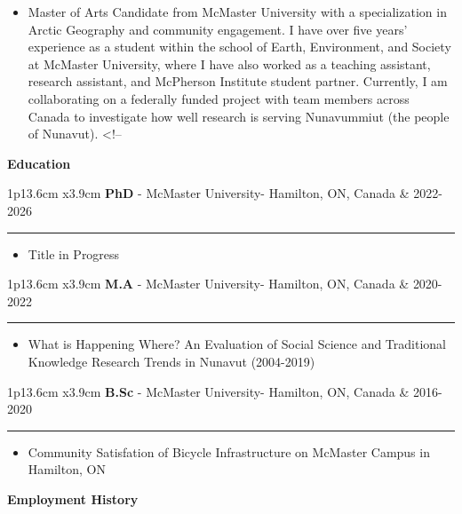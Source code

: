 \documentclass[10pt,a4paper,]{article}
\renewcommand{\section}[1]
{
	\begin{center}
		\large\textcolor{sectcol}{\textbf{#1}}
	\end{center}
}
\providecommand{\tightlist}{%
  \setlength{\itemsep}{0pt}\setlength{\parskip}{0pt}}
\newcommand{\cvevent}[4]
{

\begin{tabular*}{1\textwidth}{p{13.6cm}  x{3.9cm}}
	\textbf{#2} - \textcolor{bgcol}{#3} &   \vspace{2.5pt}\textcolor{sectcol}{#1}
\end{tabular*}

\vspace{-2pt}
\textcolor{softcol}{\hrule}
\vspace{6pt}
#4
\vspace{1em}
}
\begin{document}
\begin{itemize}
\tightlist
\item
  Master of Arts Candidate from McMaster University with a
  specialization in Arctic Geography and community engagement. I have
  over five years' experience as a student within the school of Earth,
  Environment, and Society at McMaster University, where I have also
  worked as a teaching assistant, research assistant, and McPherson
  Institute student partner. Currently, I am collaborating on a
  federally funded project with team members across Canada to
  investigate how well research is serving Nunavummiut (the people of
  Nunavut). \textless!--
\end{itemize}

\hypertarget{education}{%
\section{Education}\label{education}}

\cvevent{2022-2026}{PhD}{McMaster University- Hamilton, ON, Canada}{\begin{minipage}{0.7\textwidth}%
\begin{itemize}%
\item Title in Progress%
\end{itemize}%
\end{minipage}}
\cvevent{2020-2022}{M.A}{McMaster University- Hamilton, ON, Canada}{\begin{minipage}{0.7\textwidth}%
\begin{itemize}%
\item What is Happening Where? An Evaluation of Social Science and Traditional Knowledge Research Trends in Nunavut (2004-2019)%
\end{itemize}%
\end{minipage}}
\cvevent{2016-2020}{B.Sc}{McMaster University- Hamilton, ON, Canada}{\begin{minipage}{0.7\textwidth}%
\begin{itemize}%
\item Community Satisfation of Bicycle Infrastructure on McMaster Campus in Hamilton, ON%
\end{itemize}%
\end{minipage}}

\hypertarget{employment-history}{%
\section{Employment History}\label{employment-history}}
\end{document}
